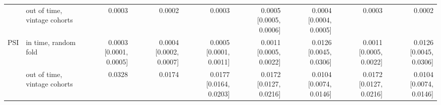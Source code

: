 \begin{tabular}{llrrrrrrr}
 & out of time, vintage cohorts & 0.0003 & 0.0002 & 0.0003 & 0.0005 [0.0005, 0.0006] & 0.0004 [0.0004, 0.0005] & 0.0003 & 0.0002 \\
\addlinespace
PSI & in time, random fold & 0.0003 [0.0001, 0.0005] & 0.0004 [0.0002, 0.0007] & 0.0005 [0.0001, 0.0011] & 0.0011 [0.0005, 0.0022] & 0.0126 [0.0045, 0.0306] & 0.0011 [0.0005, 0.0022] & 0.0126 [0.0045, 0.0306] \\
 & out of time, vintage cohorts & 0.0328 & 0.0174 & 0.0177 [0.0164, 0.0203] & 0.0172 [0.0127, 0.0216] & 0.0104 [0.0074, 0.0146] & 0.0172 [0.0127, 0.0216] & 0.0104 [0.0074, 0.0146] \\
\bottomrule
\end{tabular}
